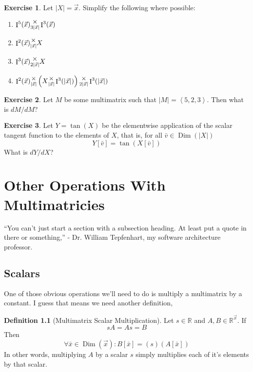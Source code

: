 \documentclass[12pt]{book}
\theoremstyle{plain}
\theoremstyle{definition}
\newtheorem{definition}{Definition}[chapter]
\newtheorem{exercise}{Exercise}[chapter]
\theoremstyle{ppart}
\theoremstyle{case}
\theoremstyle{solution}
\DeclareMathOperator{\Dim}{Dim}
\DeclareMathOperator{\Ident}{I}
\newcommand{\mmult}[1]{\text{\raisebox{1ex}{$\underset{#1}{\times}$}}}
\begin{document}
\begin{exercise}
Let $|X| = \vec{x}$. Simplify the following where possible:
\begin{enumerate}
\item $\Ident^5(\vec{x}) \mmult{3 |\vec{x}|} \Ident^3(\vec{x})$
\item $\Ident^2(\vec{x}) \mmult{|\vec{x}|} X$
\item $\Ident^3(\vec{x}) \mmult{2|\vec{x}|} X$
\item $\Ident^2(\vec{x}) \mmult{|\vec{x}|} \left(X \mmult{|\vec{x}|} \Ident^3(|\vec{x}|)
				\right) \mmult{2|\vec{x}|} \Ident^3(|\vec{x}|)$
\end{enumerate}
\end{exercise}

\begin{exercise}
Let $M$ be some multimatrix such that $|M| = \left<5,2,3\right>$. Then what is
$dM/dM$?
\end{exercise}

\begin{exercise}
Let $Y = \tan(X)$ be the elementwise application of the scalar tangent function to
the elements of $X$, that is, for all $\bar{v} \in \Dim(|X|)$
\[ Y[\bar{v}] = \tan(X[\bar{v}]) \]
What is $dY/dX$?
\end{exercise}

\chapter{Other Operations With Multimatricies}

\begin{displayquote}
``You can't just start a section with a subsection heading. At least put a quote
in there or something,'' - Dr. William Tepfenhart, my software architecture professor.
\end{displayquote}

\section{Scalars}

One of those obvious operations we'll need to do is multiply
a multimatrix by a constant. I guess that means we need another definition,

\begin{definition}[Multimatrix Scalar Multiplication]
Let $s \in \mathbb{R}$ and $A, B \in \mathbb{R}^{\vec{x}}$. If
\[ sA = As = B \]
Then
\[ \forall \bar{x} \in \Dim(\vec{x}):
   B[\bar{x}] = (s)(A[\bar{x}]) \]
In other words, multiplying $A$ by a scalar $s$ simply multiplies each of
it's elements by that scalar.
\end{definition}
\end{document}
